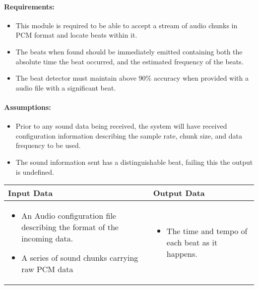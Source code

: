\documentclass[english,12pt]{scrartcl}
\begin{document}
		\paragraph{Requirements:}
		\begin{itemize}
			\item This module is required to be able to accept a stream of audio chunks in PCM format and locate beats within it.
			\item The beats when found should be immediately emitted containing both the absolute time the beat occurred, and the estimated frequency of the beats.
			\item The beat detector must maintain above 90\% accuracy when provided with a audio file with a significant beat.
		\end{itemize}
		
		\paragraph{Assumptions:}
		\begin{itemize}
			\item Prior to any sound data being received, the system will have received configuration information describing the sample rate, chunk size, and data frequency to be used.
			\item The sound information sent has a distinguishable beat, failing this the output is undefined.
		\end{itemize}
		
		\begin{tabular}{p{7cm}|p{7cm}}
    			\textbf{Input Data} & \textbf{Output Data} \\ \hline
			\begin{itemize}
				\item An Audio configuration file describing the format of the incoming data.
				\item A series of sound chunks carrying raw PCM data
			\end{itemize}
			&
			\begin{itemize}
				\item The time and tempo of each beat as it happens.
			\end{itemize}
		\end{tabular}
		
\end{document}
